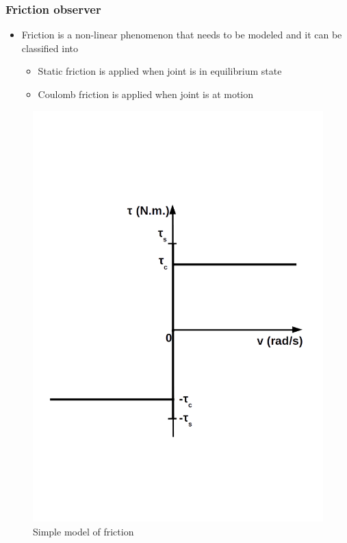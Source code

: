 \documentclass{beamer}
\begin{document}
\begin{frame}
	\frametitle{Friction observer}
	\vspace{-0.2cm}
	\begin{itemize}
		\item Friction is a non-linear phenomenon that needs to be modeled and it can be classified into
		\begin{itemize}
			\item Static friction is applied when joint is in equilibrium state
			\item Coulomb friction is applied when joint is at motion			\end{itemize}
	\end{itemize}
	\vspace{-0.45cm}
\begin{figure}[H]
	\centering
	\caption{Simple model of friction}
	\includegraphics[trim=0 0 0 220,width=0.35\paperwidth, height=0.55\paperheight]{images/friction_staticandcoulomb}
\end{figure}	
\end{frame}
\end{document}
